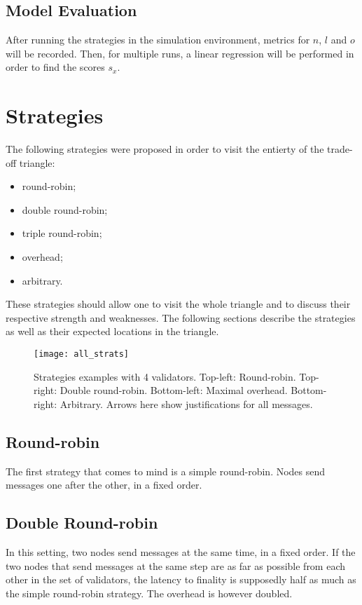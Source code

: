 \subsection{Model Evaluation}
After running the strategies in the simulation environment, metrics for \(n\),
\(l\) and \(o\) will be recorded. Then, for multiple runs, a linear regression
will be performed in order to find the scores \(s_x\).

\section{Strategies}
\label{sec:strategies}

The following strategies were proposed in order to visit the entierty of the
trade-off triangle:
\begin{itemize}
        \item round-robin;
        \item double round-robin;
        \item triple round-robin;
        \item overhead;
        \item arbitrary.
\end{itemize}
These strategies should allow one to visit the whole triangle and to discuss
their respective strength and weaknesses. The following sections describe the
strategies as well as their expected locations in the triangle.

\begin{figure}[h]
	\centering
	\texttt{[image: all\_strats]}
  \captionsetup{justification=centering}
    \caption{Strategies examples with 4 validators. Top-left: Round-robin.
    Top-right: Double round-robin. Bottom-left: Maximal overhead. Bottom-right:
    Arbitrary. Arrows here show justifications for all messages.}
	\label{fig:allStrats}
\end{figure}

\subsection{Round-robin}
The first strategy that comes to mind is a simple round-robin. Nodes send
messages one after the other, in a fixed order.


\subsection{Double Round-robin}
In this setting, two nodes send messages at the same time, in a fixed order. If
the two nodes that send messages at the same step are as far as possible from each
other in the set of validators, the latency to finality is supposedly
half as much as the simple round-robin strategy. The overhead is however
doubled.

